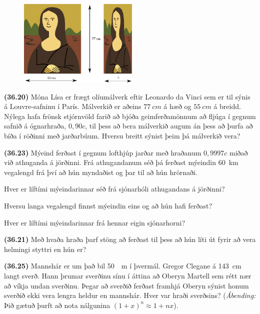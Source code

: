 \begin{enumerate}[label = \textbf{(\alph*)}]

\begin{minipage}{\linewidth}

\begin{figure}
\vspace{-0.5cm}
\includegraphics[width = 2.25in]{figures/mona-lisa.pdf}
\end{figure}

\item[\textbf{(36.20)}] Móna Lísa er frægt olíumálverk eftir Leonardo da Vinci sem er til sýnis á Louvre-safninu í París. Málverkið er aðeins $\SI{77}{cm}$ á hæð og $\SI{55}{cm}$ á breidd. Nýlega hafa frönsk stjórnvöld farið að bjóða geimferðamönnum að fljúga í gegnum safnið á ógnarhraða, $0,90c$, til þess að bera málverkið augum án þess að þurfa að bíða í röðinni með jarðarbúum. Hversu breitt sýnist þeim þá málverkið vera?

\item[\textbf{(36.23)}] Mýeind ferðast í gegnum lofthjúp jarðar með hraðanum $0,9997c$ miðað við athuganda á jörðinni. Frá athugandanum séð þá ferðast mýeindin \SI{60}{km} vegalengd frá því að hún myndaðist og þar til að hún hrörnaði. \begin{enumerate*}[label = \textbf{(\alph*)}]
    \item Hver er líftími mýeindarinnar séð frá sjónarhóli athugandans á jörðinni?
    \item Hversu langa vegalengd finnst mýeindin eins og að hún hafi ferðast?
    \item Hver er líftími mýeindarinnar frá hennar eigin sjónarhorni?
\end{enumerate*}

\item[\textbf{(36.21)}] Með hvaða hraða þarf stöng að ferðast til þess að hún líti út fyrir að vera helmingi styttri en hún er?

\item[\textbf{(36.25)}] Mannshár er um það bil \SI{50}{\mu m} í þvermál. Gregor Clegane á \SI{143}{cm} langt sverð. Hann þrumar sverðinu sínu í áttina að Oberyn Martell sem rétt nær að víkja undan sverðinu. Þegar að sverðið ferðast framhjá Oberyn sýnist honum sverðið ekki vera lengra heldur en mannshár. Hver var hraði sverðsins?  (\textit{Ábending:} Þið gætuð þurft að nota nálgunina $(1+x)^n \approx 1+ nx$).

\end{minipage}


\end{enumerate}

